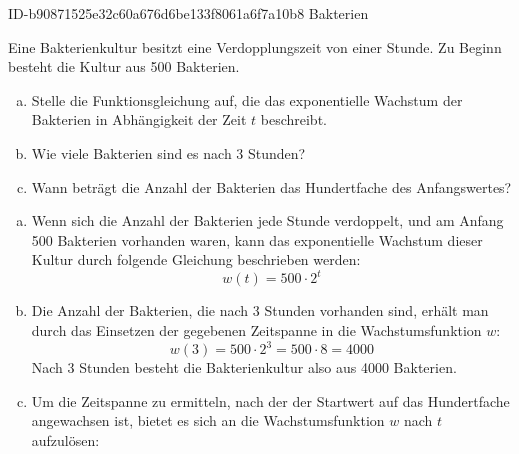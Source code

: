 \begin{exercise}
      {ID-b90871525e32c60a676d6be133f8061a6f7a10b8}
      {Bakterien}
  \ifproblem\problem\par
    Eine Bakterienkultur besitzt eine Verdopplungszeit
    von einer Stunde.
    Zu Beginn besteht die Kultur aus \num{500}
    Bakterien.
    \begin{enumerate}[a)]
      \item Stelle die Funktionsgleichung auf,
            die das exponentielle Wachstum der
            Bakterien in Abhängigkeit der Zeit
            $t$ beschreibt.
      \item Wie viele Bakterien sind es nach \num{3} Stunden?
      \item Wann beträgt die Anzahl der Bakterien das
            Hundertfache des Anfangswertes?
    \end{enumerate}
  \fi
  \ifoutcome\outcome
    \begin{enumerate}[a)]
      \item Wenn sich die Anzahl der Bakterien
            jede Stunde verdoppelt, und am
            Anfang \num{500} Bakterien
            vorhanden waren, kann das
            exponentielle Wachstum dieser
            Kultur durch folgende Gleichung
            beschrieben werden:
            \begin{equation*}
              w(t)=\num{500}\cdot2^t
            \end{equation*}
      \item Die Anzahl der Bakterien, die nach \num{3}
            Stunden vorhanden sind, erhält man durch
            das Einsetzen der gegebenen Zeitspanne in
            die Wachstumsfunktion $w$:
            \begin{equation*}
              w(3)=\num{500}\cdot2^3
                  =\num{500}\cdot8
                  =\num{4000}
            \end{equation*}
            Nach \num{3} Stunden besteht die
            Bakterienkultur also aus \num{4000}
            Bakterien.
      \item Um die Zeitspanne zu ermitteln, nach
            der der Startwert auf das Hundertfache
            angewachsen ist, bietet es sich an
            die Wachstumsfunktion $w$ nach $t$
            aufzulösen:
            \begin{alignat*}{3}
              \relax&\quad

\end{alignat*}
\end{enumerate}
\end{exercise}
